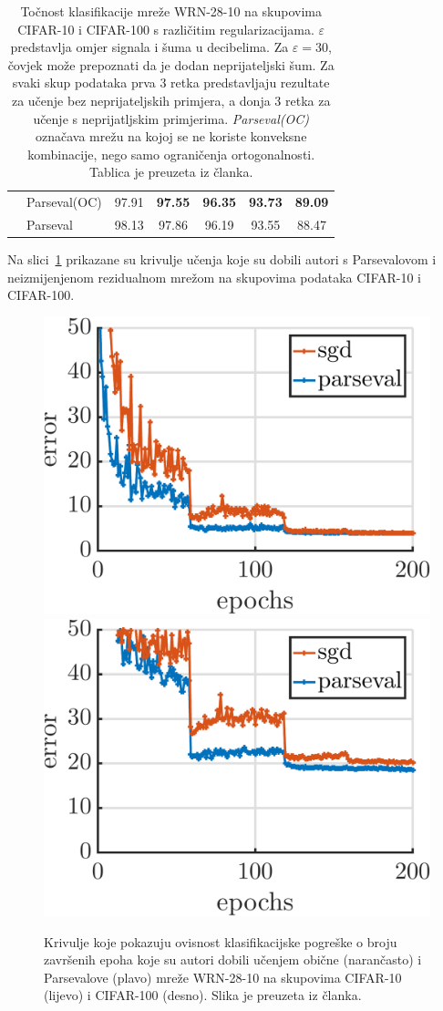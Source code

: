 \documentclass[utf8, seminar, numeric, lmodern]{feri}
\begin{document}
\begin{table}[h!]
\begin{center}
\begin{tabular}{|c|l|c|c|c|c|c|}
			& Parseval(OC)
			& 97.91       & \textbf{97.55}        & \textbf{96.35}         & \textbf{93.73}         & \textbf{89.09}      \\
			& Parseval
			& 98.13        & 97.86        & 96.19         & 93.55         & 88.47      \\
			\cline{2-7}
			\hline
		\end{tabular}
		\egroup
	\end{center}
	\caption{
	Točnost klasifikacije mreže WRN-28-10 na skupovima CIFAR-10 i CIFAR-100 s različitim regularizacijama. $\varepsilon$ predstavlja omjer signala i šuma u decibelima. Za $\varepsilon=30$, čovjek može prepoznati da je dodan neprijateljski šum. Za svaki skup podataka prva 3 retka predstavljaju rezultate za učenje bez neprijateljskih primjera, a donja 3 retka za učenje s neprijatljskim primjerima. \emph{Parseval(OC)} označava mrežu na kojoj se ne koriste konveksne kombinacije, nego samo ograničenja ortogonalnosti. Tablica je preuzeta iz članka.
	}\label{tab:adv-robustness}
\end{table}

Na slici~\ref{fig:krivulje-pogreske} prikazane su krivulje učenja koje su dobili autori s Parsevalovom i neizmijenjenom rezidualnom mrežom na skupovima podataka CIFAR-10 i CIFAR-100.

\begin{figure}[htbp]
	\centering
	\includegraphics[width=0.49\linewidth]{ilustracije/convergence/cifar10.pdf}
	\includegraphics[width=0.49\linewidth]{ilustracije/convergence/cifar100.pdf}
	\caption{
		Krivulje koje pokazuju ovisnost klasifikacijske pogreške o broju završenih epoha koje su autori dobili učenjem obične (narančasto) i Parsevalove (plavo) mreže WRN-28-10 na skupovima CIFAR-10 (lijevo) i CIFAR-100 (desno). Slika je preuzeta iz članka.
	}
	\label{fig:krivulje-pogreske}
\end{figure}
\end{document}
